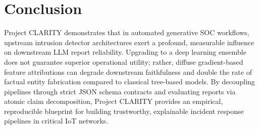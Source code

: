 \documentclass[conference]{IEEEtran}
\begin{document}
\section{Conclusion}
Project CLARITY demonstrates that in automated generative SOC workflows, upstream intrusion detector architectures exert a profound, measurable influence on downstream LLM report reliability. Upgrading to a deep learning ensemble does not guarantee superior operational utility; rather, diffuse gradient-based feature attributions can degrade downstream faithfulness and double the rate of factual entity fabrication compared to classical tree-based models. By decoupling pipelines through strict JSON schema contracts and evaluating reports via atomic claim decomposition, Project CLARITY provides an empirical, reproducible blueprint for building trustworthy, explainable incident response pipelines in critical IoT networks.
\end{document}
